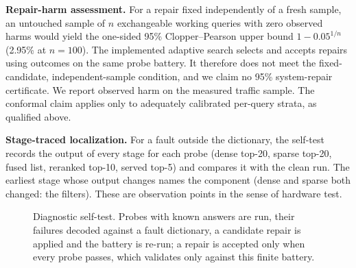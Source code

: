 \documentclass[conference]{IEEEtran}
\begin{document}
\textbf{Repair-harm assessment.} For a repair fixed independently of a fresh sample, an untouched sample of $n$ exchangeable working queries with zero observed harms would yield the one-sided 95\% Clopper--Pearson upper bound $1-0.05^{1/n}$ (2.95\% at $n{=}100$). The implemented adaptive search selects and accepts repairs using outcomes on the same probe battery. It therefore does not meet the fixed-candidate, independent-sample condition, and we claim no 95\% system-repair certificate. We report observed harm on the measured traffic sample. The conformal claim applies only to adequately calibrated per-query strata, as qualified above.

\textbf{Stage-traced localization.} For a fault outside the dictionary, the self-test records the output of every stage for each probe (dense top-20, sparse top-20, fused list, reranked top-10, served top-5) and compares it with the clean run. The earliest stage whose output changes names the component (dense and sparse both changed: the filters). These are observation points in the sense of hardware test.

\begin{figure}[t]
\centering
{}
\caption{Diagnostic self-test. Probes with known answers are run, their failures decoded against a fault dictionary, a candidate repair is applied and the battery is re-run; a repair is accepted only when every probe passes, which validates only against this finite battery.}
\label{fig:selftest}
\end{figure}
\end{document}
